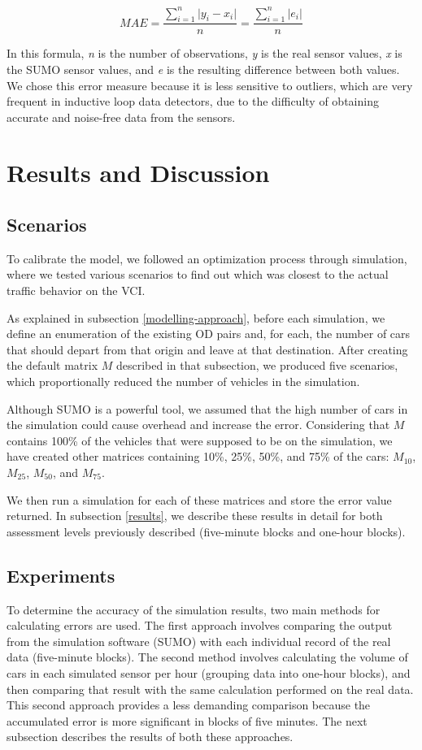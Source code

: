 \documentclass[conference]{IEEEtran}
\begin{document}
\[ MAE = \frac{\sum_{i=1}^{n} \lvert y_{i}-x_{i} \rvert }{n} = \frac{\sum_{i=1}^{n} \lvert e_{i} \rvert }{n} \]

In this formula, \textit{n} is the number of observations, \textit{y} is the real sensor values, \textit{x} is the SUMO sensor values, and \textit{e} is the resulting difference between both values.
We chose this error measure because it is less sensitive to outliers, which are very frequent in inductive loop data detectors, due to the difficulty of obtaining accurate and noise-free data from the sensors.

\section{Results and Discussion}
\label{scenarios}
\subsection{Scenarios}

To calibrate the model, we followed an optimization process through simulation, where we tested various scenarios to find out which was closest to the actual traffic behavior on the VCI.

As explained in subsection \ref{modelling-approach}, before each simulation, we define an enumeration of the existing OD pairs and, for each, the number of cars that should depart from that origin and leave at that destination.
After creating the default matrix $M$ described in that subsection, we produced five scenarios, which proportionally reduced the number of vehicles in the simulation.

Although SUMO is a powerful tool, we assumed that the high number of cars in the simulation could cause overhead and increase the error. Considering that $M$ contains 100\% of the vehicles that were supposed to be on the simulation, we have created other matrices containing 10\%, 25\%, 50\%, and 75\% of the cars: $M_{10}$, $M_{25}$, $M_{50}$, and $M_{75}$.

We then run a simulation for each of these matrices and store the error value returned.
In subsection \ref{results}, we describe these results in detail for both assessment levels previously described (five-minute blocks and one-hour blocks).

    \subsection{Experiments}
To determine the accuracy of the simulation results, two main methods for calculating errors are used. The first approach involves comparing the output from the simulation software (SUMO) with each individual record of the real data (five-minute blocks). The second method involves calculating the volume of cars in each simulated sensor per hour (grouping data into one-hour blocks), and then comparing that result with the same calculation performed on the real data. This second approach provides a less demanding comparison because the accumulated error is more significant in blocks of five minutes. The next subsection describes the results of both these approaches.
\end{document}
